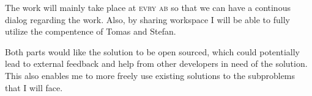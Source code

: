 \documentclass[oneside,a4paper,11pt]{kth-mag}
\begin{document}
The work will mainly take place at \textsc{evry ab} so that we can have a continous dialog regarding the work. Also, by sharing workspace I will be able to fully utilize the compentence of Tomas and Stefan.

Both parts would like the solution to be open sourced, which could potentially lead to external feedback and help from other developers in need of the solution. This also enables me to more freely use existing solutions to the subproblems that I will face.
\end{document}
